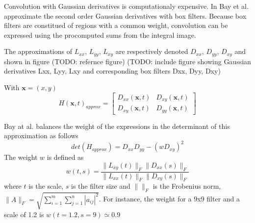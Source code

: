 Convolution with Gaussian derivatives is computationaly expensive. In \cite{Bay06surf:speeded} Bay et al. approximate the second order Gaussian derivatives with box filters. Because box filters are constitued of regions with a common weight, convolution can be expressed using the procomputed sums from the integral image.

The approximations of $L_{xx}$, $L_{yy}$, $L_{xy}$ are respectively denoted $D_{xx}$, $D_{yy}$, $D_{xy}$ and shown in figure (TODO: refernce figure) (TODO: include figure showing Gaussian derivatives Lxx, Lyy, Lxy and corresponding box filters Dxx, Dyy, Dxy)

With $\mathbf{x} = (x,y)$
\begin{displaymath}
    H(\mathbf{x},t)_{approx} = 
    \begin{bmatrix}
        D_{xx}(\mathbf{x},t) & D_{xy}(\mathbf{x},t) \\
        D_{xy}(\mathbf{x},t) & D_{yy}(\mathbf{x},t)
    \end{bmatrix}
\end{displaymath}

Bay at al. balances the weight of the expressions in the determinant of this approximation as follows
\begin{equation}
    det(H_{approx}) = D_{xx} D_{yy} - (w D_{xy})^2
\end{equation}
The weight $w$ is defined as 
\begin{equation}
w(t,s) = \frac{\|L_{xy}(t)\|_F \|D_{xx}(s)\|_F}{\|L_{xx}(t)\|_F \|D_{xy}(s)\|_F}
\end{equation}
where $t$ is the scale, $s$ is the filter size and $\|\|_F$ is the Frobenius norm, $\|A\|_F=\sqrt{\sum_{i=1}^m\sum_{j=1}^n |a_{ij}|^2}$.
For instance, the weight for a 9x9 filter and a scale of 1.2 is $w(t=1.2, s=9) \simeq 0.9$

